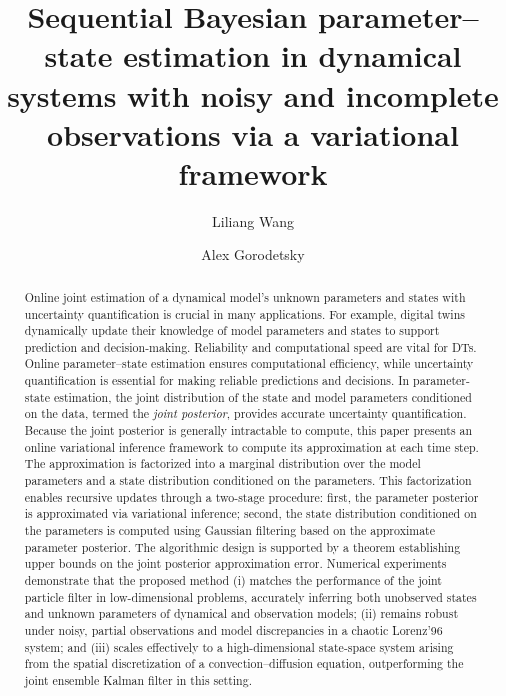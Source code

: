 \documentclass[preprint,3p,times]{elsarticle}
\begin{document}
%
\begin{frontmatter}

\title{Sequential Bayesian parameter–state estimation in dynamical systems with noisy and incomplete observations via a variational framework}

\author[label1]{Liliang Wang}
\author[label2]{Alex Gorodetsky}


\begin{abstract}
Online joint estimation of a dynamical model’s unknown parameters and states with uncertainty quantification is crucial in many applications. For example, digital twins dynamically update their knowledge of model parameters and states to support prediction and decision-making. Reliability and computational speed are vital for DTs. Online parameter–state estimation ensures computational efficiency, while uncertainty quantification is essential for making reliable predictions and decisions. In parameter-state estimation, the joint distribution of the state and model parameters conditioned on the data, termed the \textit{joint posterior}, provides accurate uncertainty quantification. Because the joint posterior is generally intractable to compute, this paper presents an online variational inference framework to compute its approximation at each time step. The approximation is factorized into a marginal distribution over the model parameters and a state distribution conditioned on the parameters. This factorization enables recursive updates through a two-stage procedure: first, the parameter posterior is approximated via variational inference; second, the state distribution conditioned on the parameters is computed using Gaussian filtering based on the approximate parameter posterior. The algorithmic design is supported by a theorem establishing upper bounds on the joint posterior approximation error. Numerical experiments demonstrate that the proposed method (i) matches the performance of the joint particle filter in low-dimensional problems, accurately inferring both unobserved states and unknown parameters of dynamical and observation models; (ii) remains robust under noisy, partial observations and model discrepancies in a chaotic Lorenz'96 system; and (iii) scales effectively to a high-dimensional state-space system arising from the spatial discretization of a convection–diffusion equation, outperforming the joint ensemble Kalman filter in this setting.
\end{abstract}


\end{frontmatter}
\end{document}
